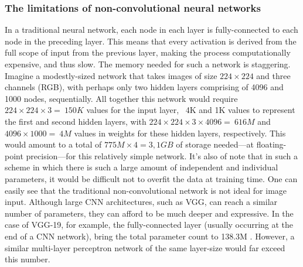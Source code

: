 \subsubsection{The limitations of non-convolutional neural networks}
In a traditional neural network, each node in each layer is fully-connected to each node in the preceding layer. This means that every activation is derived from the full scope of input from the previous layer, making the process computationally expensive, and thus slow. The memory needed for such a network is staggering. Imagine a modestly-sized network that takes images of size $224\times224$ and three channels (RGB), with perhaps only two hidden layers comprising of 4096 and 1000 nodes, sequentially. All together this network would require $224\times224\times3 = ~150K$ values for the input layer, ~4K and 1K values to represent the first and second hidden layers, with $224\times224\times3\times4096 = ~616M$ and $4096\times1000 = ~4M$ values in weights for these hidden layers, respectively. This would amount to a total of $775M\times4 = 3,1 GB$ of storage needed---at floating-point precision---for this relatively simple network. It's also of note that in such a scheme in which there is such a large amount of independent and individual parameters, it would be difficult not to overfit the data at training time. One can easily see that the traditional non-convolutional network is not ideal for image input. Although large CNN architectures, such as VGG, can reach a similar number of parameters, they can afford to be much deeper and expressive. In the case of VGG-19, for example, the fully-connected layer (usually occurring at the end of a CNN network), bring the total parameter count to 138.3M \cite{return}. However, a similar multi-layer perceptron network of the same layer-size would far exceed this number.


